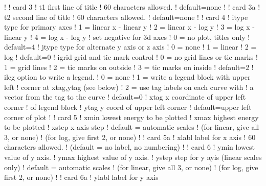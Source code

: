 \begin{ccode}
   !
   !  card 3
   !     t1            first line of title
   !                   60 characters allowed.
   !                   default=none
   !
   !  card 3a
   !     t2            second line of title
   !                   60 characters allowed.
   !                   default=none
   !
   !  card 4
   !     itype         type for primary axes
   !                     1 = linear x - linear y
   !                     2 = linear x - log y
   !                     3 = log x - linear y
   !                     4 = log x - log y
   !                     set negative for 3d axes
   !                     0 = no plot, titles only
   !                     default=4
   !     jtype         type for alternate y axis or z axis
   !                     0 = none
   !                     1 = linear
   !                     2 = log
   !                     default=0
   !     igrid         grid and tic mark control
   !                     0 = no grid lines or tic marks
   !                     1 = grid lines
   !                     2 = tic marks on outside
   !                     3 = tic marks on inside
   !                     default=2
   !     ileg          option to write a legend.
   !                     0 = none
   !                     1 = write a legend block with upper left
   !                         corner at xtag,ytag (see below)
   !                     2 = use tag labels on each curve with
   !                         a vector from the tag to the curve
   !                     default=0
   !     xtag          x coordinate of upper left corner
   !                   of legend block
   !     ytag          y coord of upper left corner
   !                   default=upper left corner of plot
   !
   !  card 5
   !     xmin          lowest energy to be plotted
   !     xmax          highest energy to be plotted
   !     xstep         x axis step
   !                   default = automatic scales
   !                   (for linear, give all 3, or none)
   !                   (for log, give first 2, or none)
   !
   !  card 5a
   !     xlabl         label for x axis
   !                   60 characters allowed.
   !                   (default = no label, no numbering)
   !
   !  card 6
   !     ymin          lowest value of y axis.
   !     ymax          highest value of y axis.
   !     ystep         step for y ayis (linear scales only)
   !                   default = automatic scales
   !                   (for linear, give all 3, or none)
   !                   (for log, give first 2, or none)
   !
   !  card 6a
   !     ylabl         label for y axis

\end{ccode}
